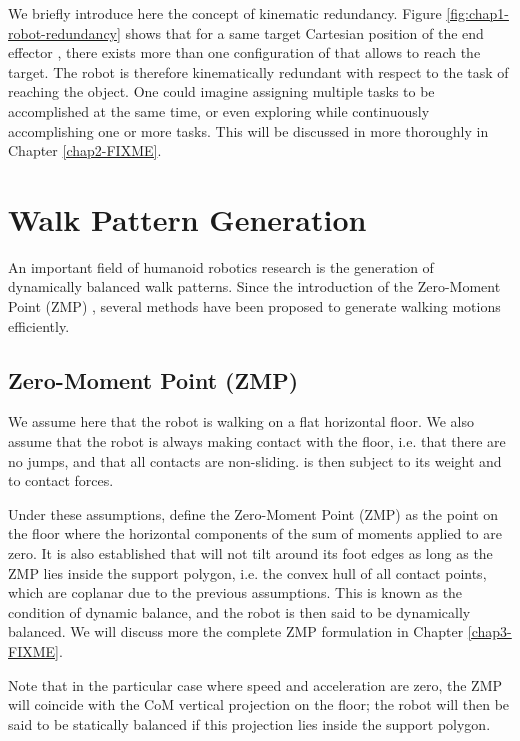 We briefly introduce here the concept of kinematic redundancy. Figure
\ref{fig:chap1-robot-redundancy} shows that for a same target
Cartesian position of the end effector , there exists more
than one configuration of \robot that allows  to reach the
target. The robot \robot is therefore kinematically redundant with
respect to the task of reaching the object. One could imagine
assigning multiple tasks to be accomplished at the same time, or even
exploring \cspace while continuously accomplishing one or more
tasks. This will be discussed in more thoroughly in Chapter
\ref{chap2-FIXME}.

\section{Walk Pattern Generation}
\label{sec:chap1-pattern-generator}

An important field of humanoid robotics research is the generation of
dynamically balanced walk patterns. Since the introduction of the
Zero-Moment Point (ZMP) \cite{vukobratovic1969contribution}, several
methods have been proposed to generate walking motions efficiently.

\subsection{Zero-Moment Point (ZMP)}
\label{subsec:chap1-zmp}

We assume here that the robot \robot is walking on a flat horizontal
floor. We also assume that the robot is always making contact with the
floor, i.e. that there are no jumps, and that all contacts are
non-sliding. \robot is then subject to its weight and to contact
forces.

Under these assumptions, \cite{vukobratovic1969contribution} define
the Zero-Moment Point (ZMP) as the point on the floor where the
horizontal components of the sum of moments applied to \robot are
zero. It is also established that \robot will not tilt around its foot
edges as long as the ZMP lies inside the support polygon, i.e. the
convex hull of all contact points, which are coplanar due to the
previous assumptions. This is known as the condition of dynamic
balance, and the robot \robot is then said to be dynamically
balanced. We will discuss more the complete ZMP formulation in Chapter
\ref{chap3-FIXME}.

Note that in the particular case where speed and acceleration are
zero, the ZMP will coincide with the CoM vertical projection on the
floor; the robot \robot will then be said to be statically balanced if
this projection lies inside the support polygon.

